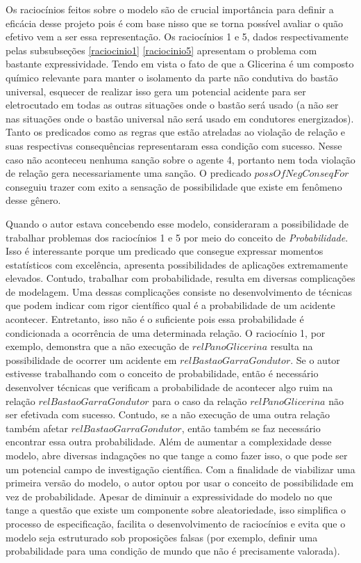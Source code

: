 Os raciocínios feitos sobre o modelo são de crucial importância para definir a eficácia desse projeto pois é com base nisso que se torna possível avaliar o quão efetivo vem a ser essa representação. Os raciocínios 1 e 5, dados respectivamente pelas subsubseções \ref{raciocinio1} \ref{raciocinio5} apresentam o problema com bastante expressividade. Tendo em vista o fato de que a Glicerina  é um composto químico relevante para manter o isolamento da parte não condutiva do bastão universal, esquecer de realizar isso gera um potencial acidente para ser eletrocutado em todas as outras situações onde o bastão será usado (a não ser nas situações onde o bastão universal não será usado em condutores energizados). Tanto os predicados como as regras que estão atreladas ao violação de relação e suas respectivas consequências representaram essa condição com sucesso. Nesse caso não aconteceu nenhuma sanção sobre o agente 4, portanto nem toda violação de relação gera necessariamente uma sanção. O predicado $possOfNegConseqFor$ conseguiu trazer com exito a sensação de possibilidade que existe em fenômeno desse gênero. 

Quando o autor estava concebendo esse modelo, consideraram a possibilidade de trabalhar problemas dos raciocínios 1 e 5 por meio do conceito de \textit{Probabilidade}. Isso é interessante porque um predicado que consegue expressar momentos estatísticos com excelência, apresenta possibilidades de aplicações extremamente elevados. Contudo, trabalhar com probabilidade, resulta em diversas complicações de modelagem. Uma dessas complicações consiste no desenvolvimento de técnicas que podem indicar com rigor científico qual é a probabilidade de um acidente acontecer. Entretanto, isso não é o suficiente pois essa probabilidade é condicionada a ocorrência de uma determinada relação. O raciocínio 1, por exemplo, demonstra que a não execução de $relPanoGlicerina$ resulta na possibilidade de ocorrer um acidente em $relBastaoGarraGondutor$. Se o autor estivesse trabalhando com o conceito de probabilidade, então é necessário desenvolver técnicas que verificam a probabilidade de acontecer algo ruim na relação $relBastaoGarraGondutor$ para o caso da relação $relPanoGlicerina$ não ser efetivada com sucesso. Contudo, se a não execução de uma outra relação também afetar $relBastaoGarraGondutor$, então também se faz necessário encontrar essa outra probabilidade. Além de aumentar a complexidade desse modelo, abre diversas indagações no que tange a como fazer isso, o que pode ser um potencial campo de investigação científica. Com a finalidade de viabilizar uma primeira versão do modelo, o autor optou por usar o conceito de possibilidade em vez de probabilidade. Apesar de diminuir a expressividade do modelo no que tange a questão que existe um componente sobre aleatoriedade, isso simplifica o processo de especificação, facilita o desenvolvimento de raciocínios e evita que o modelo seja estruturado sob proposições falsas (por exemplo, definir uma probabilidade para uma condição de mundo que não é precisamente valorada). 

